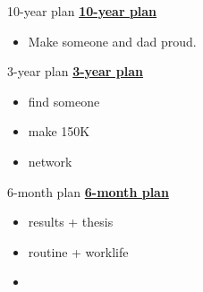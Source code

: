 \begin{columns}
\fi

\ifdefined\POSTER
  \begin{column}{0.5\columnwidth}
    \begin{block}{10-year plan}   %
\else
 \underline{\bf 10-year plan}
\fi
      \begin{itemize}
      \item \small Make someone and dad proud.
      \end{itemize}
\ifdefined\POSTER
    \end{block}
\fi

\ifdefined\POSTER
    \begin{block}{3-year plan}
\else
\underline{\bf 3-year plan}
\fi
      \begin{itemize}
      \item \small find someone
      \item \small make 150K
      \item \small network
      \end{itemize}
\ifdefined\POSTER
    \end{block}
\fi

\ifdefined\POSTER
    \begin{block}{6-month plan}
\else
\underline{\bf 6-month plan}
\fi
        \begin{itemize}
          \small \item \small results + thesis
          \item \small routine + worklife
          \item \small
          \end{itemize}
\ifdefined\POSTER
    \end{block}
\fi


\end{column}
\end{columns}
